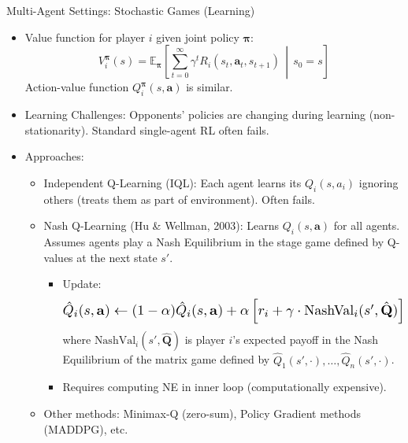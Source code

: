\documentclass[10pt]{beamer}
\newcommand{\E}{\mathbb{E}}
\begin{document}

\begin{frame}{Multi-Agent Settings: Stochastic Games (Learning)}
    \begin{itemize}
        \item Value function for player $i$ given joint policy $\boldsymbol{\pi}$:
        \begin{equation}
            V_i^{\boldsymbol{\pi}}(s) = \E_{\boldsymbol{\pi}}\left[\sum_{t=0}^{\infty} \gamma^t R_i(s_t, \mathbf{a}_t, s_{t+1}) \,\middle|\, s_0 = s\right]
        \end{equation}
        Action-value function $Q_i^{\boldsymbol{\pi}}(s, \mathbf{a})$ is similar.

        \item Learning Challenges: Opponents' policies are changing during learning (non-stationarity). Standard single-agent RL often fails.

        \item Approaches:
         \begin{itemize}
             \item Independent Q-Learning (IQL): Each agent learns its $Q_i(s, a_i)$ ignoring others (treats them as part of environment). Often fails.
             \item Nash Q-Learning (Hu \& Wellman, 2003): Learns $Q_i(s, \mathbf{a})$ for all agents. Assumes agents play a Nash Equilibrium in the stage game defined by Q-values at the next state $s'$.
              \begin{itemize}
                 \item Update:
                 \begin{equation*}
                 \resizebox{0.9\hsize}{!}{$\hat{Q}_i(s,\mathbf{a}) \leftarrow (1-\alpha)\hat{Q}_i(s,\mathbf{a}) + \alpha \left[ r_i + \gamma \cdot \text{NashVal}_i(s',\hat{\mathbf{Q}}) \right]$}
                 \end{equation*}
                 where $\text{NashVal}_i(s',\hat{\mathbf{Q}})$ is player $i$'s expected payoff in the Nash Equilibrium of the matrix game defined by $\hat{Q}_1(s',\cdot), \ldots, \hat{Q}_n(s',\cdot)$.
                 \item Requires computing NE in inner loop (computationally expensive).
             \end{itemize}
             \item Other methods: Minimax-Q (zero-sum), Policy Gradient methods (MADDPG), etc.
         \end{itemize}

    \end{itemize}
\end{frame}
\end{document}
